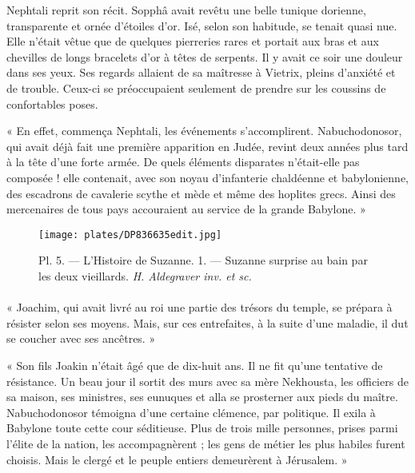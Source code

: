 \documentclass[a4paper, 11pt, oneside, polutonikogreek, french]{article}
\begin{document}
\bigskip
\centerline{\EightStarTaper}
\centerline{\EightStarTaper\EightStarTaper}
\bigskip

Nephtali reprit son récit. Sopphâ avait revêtu une belle tunique dorienne, transparente et ornée d'étoiles d'or. Isé, selon son habitude, se tenait quasi nue. Elle n'était vêtue que de quelques pierreries rares et portait aux bras et aux chevilles de longs bracelets d'or à têtes de serpents. Il y avait ce soir une douleur dans ses yeux. Ses regards allaient de sa maîtresse à Vietrix, pleins d'anxiété et de trouble. Ceux-ci se préoccupaient seulement de prendre sur les coussins de confortables poses.

\bigskip
\centerline{\EightStarTaper}
\centerline{\EightStarTaper\EightStarTaper}
\bigskip

« En effet, commença Nephtali, les événements s'accomplirent. Nabuchodonosor, qui avait déjà fait une première apparition en Judée, revint deux années plus tard à la tête d'une forte armée. De quels éléments disparates n'était-elle pas composée ! elle contenait, avec son noyau d'infanterie chaldéenne et babylonienne, des escadrons de cavalerie scythe et mède et même des hoplites grecs. Ainsi des mercenaires de tous pays accouraient au service de la grande Babylone. »
\clearpage
\vspace*{\fill}
\begin{figure}[H]
\centering
\texttt{[image: plates/DP836635edit.jpg]}
\caption{Pl. 5. --- L'Histoire de Suzanne. 1. --- Suzanne surprise au bain par les deux vieillards. \emph{H. Aldegraver inv. et sc.}}
\end{figure}
\vspace*{\fill}
\clearpage
\paragraph{}
« Joachim, qui avait livré au roi une partie des trésors du temple, se prépara à résister selon ses moyens. Mais, sur ces entrefaites, à la suite d'une maladie, il dut se coucher avec ses ancêtres. »

« Son fils Joakin n'était âgé que de dix-huit ans. Il ne fit qu'une tentative de résistance. Un beau jour il sortit des murs avec sa mère Nekhousta, les officiers de sa maison, ses ministres, ses eunuques et alla se prosterner aux pieds du maître. Nabuchodonosor témoigna d'une certaine clémence, par politique. Il exila à Babylone toute cette cour séditieuse. Plus de trois mille personnes, prises parmi l'élite de la nation, les accompagnèrent ; les gens de métier les plus habiles furent choisis. Mais le clergé et le peuple entiers demeurèrent à Jérusalem. »
\end{document}
